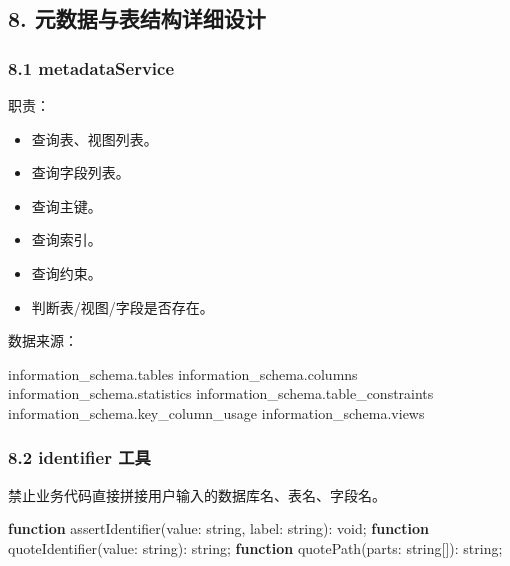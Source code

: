\documentclass[
  a4paper,
  UTF8]{ctexart}
\newenvironment{Shaded}{}{}
\newcommand{\DataTypeTok}[1]{\textcolor[rgb]{0.56,0.13,0.00}{#1}}
\newcommand{\FunctionTok}[1]{\textcolor[rgb]{0.02,0.16,0.49}{#1}}
\newcommand{\KeywordTok}[1]{\textcolor[rgb]{0.00,0.44,0.13}{\textbf{#1}}}
\newcommand{\NormalTok}[1]{#1}
\newcommand{\OperatorTok}[1]{\textcolor[rgb]{0.40,0.40,0.40}{#1}}
\providecommand{\tightlist}{%
  \setlength{\itemsep}{0pt}\setlength{\parskip}{0pt}}
\begin{document}
\hypertarget{ux5143ux6570ux636eux4e0eux8868ux7ed3ux6784ux8be6ux7ec6ux8bbeux8ba1}{%
\subsection{8.
元数据与表结构详细设计}\label{ux5143ux6570ux636eux4e0eux8868ux7ed3ux6784ux8be6ux7ec6ux8bbeux8ba1}}

\hypertarget{metadataservice}{%
\subsubsection{8.1 metadataService}\label{metadataservice}}

职责：

\begin{itemize}
\tightlist
\item
  查询表、视图列表。
\item
  查询字段列表。
\item
  查询主键。
\item
  查询索引。
\item
  查询约束。
\item
  判断表/视图/字段是否存在。
\end{itemize}

数据来源：

\begin{Shaded}
\begin{Highlighting}[]
\NormalTok{information\_schema.tables}
\NormalTok{information\_schema.columns}
\NormalTok{information\_schema.statistics}
\NormalTok{information\_schema.table\_constraints}
\NormalTok{information\_schema.key\_column\_usage}
\NormalTok{information\_schema.views}
\end{Highlighting}
\end{Shaded}

\hypertarget{identifier-ux5de5ux5177}{%
\subsubsection{8.2 identifier 工具}\label{identifier-ux5de5ux5177}}

禁止业务代码直接拼接用户输入的数据库名、表名、字段名。

\begin{Shaded}
\begin{Highlighting}[]
\KeywordTok{function} \FunctionTok{assertIdentifier}\NormalTok{(value}\OperatorTok{:} \DataTypeTok{string}\OperatorTok{,}\NormalTok{ label}\OperatorTok{:} \DataTypeTok{string}\NormalTok{)}\OperatorTok{:} \DataTypeTok{void}\OperatorTok{;}
\KeywordTok{function} \FunctionTok{quoteIdentifier}\NormalTok{(value}\OperatorTok{:} \DataTypeTok{string}\NormalTok{)}\OperatorTok{:} \DataTypeTok{string}\OperatorTok{;}
\KeywordTok{function} \FunctionTok{quotePath}\NormalTok{(parts}\OperatorTok{:} \DataTypeTok{string}\NormalTok{[])}\OperatorTok{:} \DataTypeTok{string}\OperatorTok{;}
\end{Highlighting}
\end{Shaded}
\end{document}
